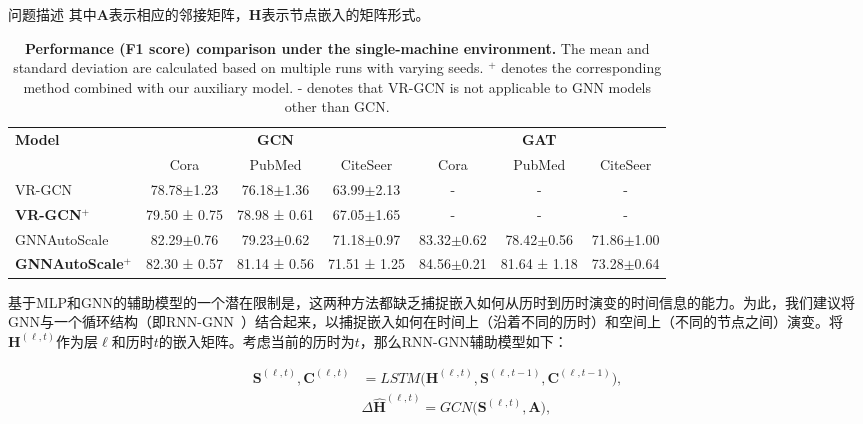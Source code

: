 \begin{section}{问题描述}
其中$\textbf{A}$表示相应的邻接矩阵，$\textbf{H}$表示节点嵌入的矩阵形式。


\begin{table*}[th!]
    \small
    \centering
    \caption{\textbf{Performance (F1 score) comparison under the single-machine environment.} The mean and standard deviation are calculated based on multiple runs with varying seeds. $^{+}$ denotes the corresponding method combined with our auxiliary model. - denotes that VR-GCN is not applicable to GNN models other than GCN.}
    \vspace{-2mm}
        \begin{tabular}{lcccccc}
        \toprule
        \multirow{2}{*}{\textbf{Model}} & \multicolumn{3}{c}{\textbf{GCN}} & \multicolumn{3}{c}{\textbf{GAT}}\\  \cmidrule(lr){2-4}\cmidrule(lr){5-7}
               & Cora    &   PubMed  &   CiteSeer      &  Cora &  PubMed &   CiteSeer  \\ 
        \midrule 
        VR-GCN & 78.78$\pm$1.23 &  76.18$\pm$1.36 &  63.99$\pm$2.13    &  -   & - & - \\
         \textbf{VR-GCN}$^{+}$    &  79.50 ± 0.75 & 78.98 ± 0.61 & 67.05$\pm$1.65  &       -     & -  &  - \\
        GNNAutoScale    &  82.29$\pm$0.76 & 79.23$\pm$0.62   &   71.18$\pm$0.97      &  83.32$\pm$0.62   & 78.42$\pm$0.56
        & 71.86$\pm$1.00  \\
         \textbf{GNNAutoScale}$^{+}$    &  82.30 ± 0.57 &   81.14 ± 0.56  
        &       71.51 ± 1.25        &     84.56$\pm$0.21      &    81.64 ± 1.18  &    73.28$\pm$0.64  \\
        \bottomrule
        \end{tabular}%
        \label{tab:comparative results single}
        \vspace{-2mm}
    \end{table*}

    基于MLP和GNN的辅助模型的一个潜在限制是，这两种方法都缺乏捕捉嵌入如何从历时到历时演变的时间信息的能力。为此，我们建议将GNN与一个循环结构（即RNN-GNN~\cite{wu2022graph}）结合起来，以捕捉嵌入如何在时间上（沿着不同的历时）和空间上（不同的节点之间）演变。将$\textbf{H}^{(\ell,t)}$作为层$\ell$和历时$t$的嵌入矩阵。考虑当前的历时为$t$，那么RNN-GNN辅助模型如下：

    \begin{equation}
        \begin{split}
            \mathbf{S}^{(\ell,t)}, \mathbf{C}^{(\ell,t)} &= LSTM\big(\mathbf{H}^{(\ell,t)}, \mathbf{S}^{(\ell,t-1)}, \mathbf{C}^{(\ell,t-1)}  \big), \\
            &\Delta\mathbf{\hat{H}}^{(\ell,t)} = GCN\big(\mathbf{S}^{(\ell,t)}, \mathbf{A}\big),
        \end{split}
    \label{eq:aux rnn-gnn}
    \end{equation}



\end{section}
